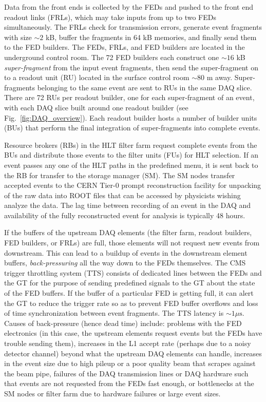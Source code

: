 \documentclass[dissertation.tex]{subfiles}
\begin{document}
Data from the front ends is collected by the FEDs and pushed to the front end readout links (FRLs), which may take inputs from up to two FEDs simultaneously.  The FRLs check for transmission errors, generate event fragments with size $\sim2$ kB, buffer the fragments in 64 kB memories, and finally send them to the FED builders.  The FEDs, FRLs, and FED builders are located in the underground control room.  The 72 FED builders each construct one $\sim16$ kB \textit{super-fragment} from the input event fragments, then send the super-fragment on to a readout unit (RU) located in the surface control room $\sim80$ m away.  Super-fragments belonging to the same event are sent to RUs in the same DAQ slice.  There are 72 RUs per readout builder, one for each super-fragment of an event, with each DAQ slice built around one readout builder (see Fig.~\ref{fig:DAQ_overview}).  Each readout builder hosts a number of builder units (BUs) that perform the final integration of super-fragments into complete events.

Resource brokers (RBs) in the HLT filter farm request complete events from the BUs and distribute those events to the filter units (FUs) for HLT selection.  If an event passes any one of the HLT paths in the predefined menu, it is sent back to the RB for transfer to the storage manager (SM).  The SM nodes transfer accepted events to the CERN Tier-0 prompt reconstruction facility for unpacking of the raw data into ROOT \cite{ROOT} files that can be accessed by physicists wishing analyze the data.  The lag time between recording of an event in the DAQ and availability of the fully reconstructed event for analysis is typically 48 hours.

If the buffers of the upstream DAQ elements (the filter farm, readout builders, FED builders, or FRLs) are full, those elements will not request new events from downstream.  This can lead to a buildup of events in the downstream element buffers, \textit{back-pressuring} all the way down to the FEDs themselves.  The CMS trigger throttling system (TTS) consists of dedicated lines between the FEDs and the GT for the purpose of sending predefined signals to the GT about the state of the FED buffers.  If the buffer of a particular FED is getting full, it can alert the GT to reduce the trigger rate so as to prevent FED buffer overflows and loss of time synchronization between event fragments.  The TTS latency is $\sim1 \mu\mbox{s}$.  Causes of back-pressure (hence dead time) include: problems with the FED electronics (in this case, the upstream elements request events but the FEDs have trouble sending them), increases in the L1 accept rate (perhaps due to a noisy detector channel) beyond what the upstream DAQ elements can handle, increases in the event size due to high pileup or a poor quality beam that scrapes against the beam pipe, failures of the DAQ transmission lines or DAQ hardware such that events are not requested from the FEDs fast enough, or bottlenecks at the SM nodes or filter farm due to hardware failures or large event sizes.
\end{document}
